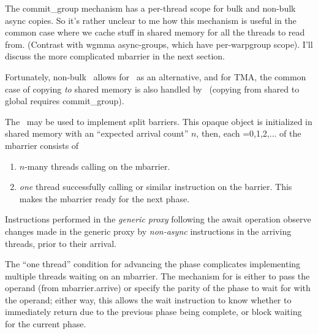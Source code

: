 \filbreak
{} The commit\_group mechanism has a per-thread scope for bulk and non-bulk async copies. So it's rather unclear to me how this mechanism is useful in the common case where we cache stuff in shared memory for all the threads to read from. (Contrast with wgmma async-groups, which have per-warpgroup scope). I'll discuss the more complicated mbarrier in the next section.

Fortunately, non-bulk \cpAsync\ allows for \mbarrier\ as an alternative, and for TMA, the common case of copying \textit{to} shared memory is also handled by \mbarrier\ (copying from shared to global requires commit\_group).

\filbreak
{}

 The \mbarrier\ may be used to implement split barriers. This opaque object is initialized in shared memory with an ``expected arrival count'' $n$, then, each =0,1,2,... of the mbarrier consists of

\begin{enumerate}
  \item $n$-many threads calling  on the mbarrier.
  \item \textit{one} thread successfully calling  or similar instruction on the barrier. This makes the mbarrier ready for the next phase.
\end{enumerate}

\filbreak
Instructions performed in the \textit{generic proxy} following the await operation observe changes made in the generic proxy by \textit{non-async} instructions in the arriving threads, prior to their arrival.

\filbreak
The ``one thread'' condition for advancing the phase complicates implementing multiple threads waiting on an mbarrier. The mechanism for  is either to pass the  operand (from mbarrier.arrive) or specify the parity of the phase to wait for with the  operand; either way, this allows the wait instruction to know whether to immediately return due to the previous phase being complete, or block waiting for the current phase.

